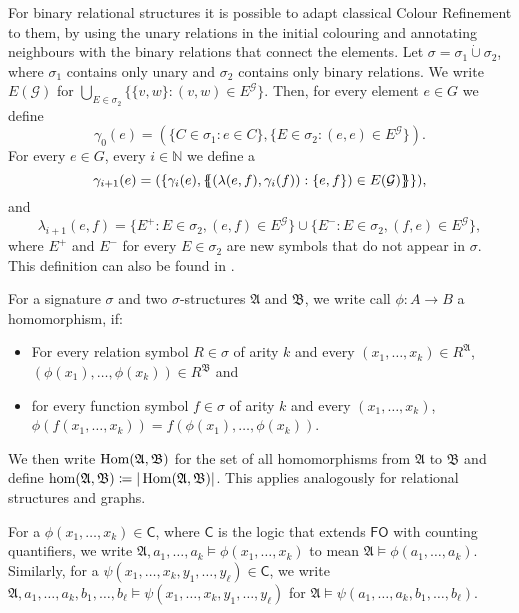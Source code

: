 For binary relational structures it is possible to adapt classical Colour Refinement to them, by using the unary relations in the initial colouring and annotating neighbours with the binary relations that connect the elements.
Let $\sigma=\sigma_1\operatorname{\dot{\cup}}\sigma_2$, where $\sigma_1$ contains only unary and $\sigma_2$ contains only binary relations.
We write $E(\mathcal G)$ for $\bigcup_{E\in \sigma_2} \{\{v,w \} : (v,w)\in E^{\mathcal G}\}$.
Then, for every element $e\in G$ we define
$$\gamma_0(e)=(\{C\in \sigma_1 : e\in C\}, \{E\in \sigma_2 : (e,e)\in E^{\mathcal G}\}).$$
For every $e\in G$, every $i\in \mathbb N$ we define a
$$\gamma_{i+1}(e)=(\{\gamma_i(e), \left\{\kern-.35em\left\{(\lambda(e,f), \gamma_i(f)) : \{e,f\})\in E(\mathcal G)\right\}\kern-.35em\right\}\}),$$
and
$$\lambda_{i+1}(e,f)=\{E^+ : E\in\sigma_2, (e,f)\in E^{\mathcal G}\} \cup \{E^- : E\in \sigma_2, (f,e)\in E^{\mathcal G}\},$$
where $E^+$ and $E^-$ for every $E\in \sigma_2$ are new symbols that do not appear in $\sigma$.
This definition can also be found in \cite{scheidt2025ColorRefinement}.

For a signature $\sigma$ and two $\sigma$-structures $\mathfrak A$ and $\mathfrak B$, we write call $\phi:A\to B$ a homomorphism, if:
\begin{itemize}
	\item For every relation symbol $R\in\sigma$ of arity $k$ and every $(x_1,\dots,x_k)\in R^{\mathfrak A}$, $(\phi(x_1),\dots,\phi(x_k))\in R^{\mathfrak B}$ and
	\item for every function symbol $f\in \sigma$ of arity $k$ and every $(x_1,\dots,x_k)$, $\phi(f(x_1,\dots,x_k))=f(\phi(x_1),\dots,\phi(x_k))$.
\end{itemize}
We then write $\operatorname{Hom}(\mathfrak A, \mathfrak B)$ for the set of all homomorphisms from $\mathfrak A$ to $\mathfrak B$ and define $\hom(\mathfrak A,\mathfrak B)\coloneqq \vert\operatorname{Hom}(\mathfrak A,\mathfrak B)\vert$.
This applies analogously for relational structures and graphs.

For a $\phi(x_1,\dots,x_k)\in\mathsf C$, where $\mathsf C$ is the logic that extends $\mathsf{FO}$ with counting quantifiers, we write $\mathfrak A,a_1,\dots,a_k\models \phi(x_1,\dots,x_k)$ to mean $\mathfrak A\models \phi(a_1,\dots,a_k)$.
Similarly, for a $\psi(x_1,\dots,x_k,y_1,\dots,y_\ell)\in\mathsf C$, we write $\mathfrak A,a_1,\dots,a_k,b_1,\dots,b_\ell\models \psi(x_1,\dots,x_k,y_1,\dots,y_\ell)$ for $\mathfrak A\models \psi(a_1,\dots,a_k,b_1,\dots,b_\ell)$.






